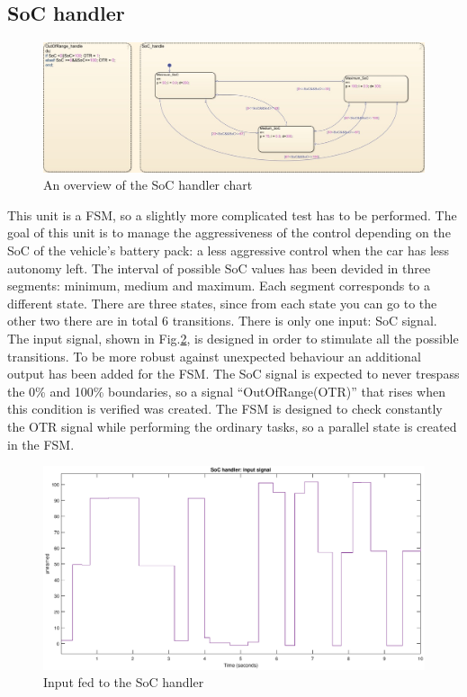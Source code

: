 \documentclass[12pt,a4paper]{report}
\begin{document}
\subsection{SoC handler}
\begin{figure}[!h]
	\centering
	\includegraphics[scale=0.34]{SoC_handle_subs.jpg}
	\caption{An overview of the SoC handler chart}
	\label{SoC_handle_subs}
\end{figure}
\FloatBarrier
This unit is a FSM, so a slightly more complicated test has to be performed. The goal of this unit is to manage the aggressiveness of the control depending on the SoC of the vehicle’s battery pack: a less aggressive control when the car has less autonomy left. The interval of possible SoC values has been devided in three segments: minimum, medium and maximum. Each segment corresponds to a different state. There are three states, since from each state you can go to the other two there are in total 6 transitions.  There is only one input: SoC signal. The input signal, shown in Fig.\ref{SoC_handle_input}, is designed in order to stimulate all the possible transitions. 
To be more robust against unexpected behaviour an additional output has been added for the FSM. The SoC signal is expected to never trespass the 0\% and 100\% boundaries, so a signal “OutOfRange(OTR)” that rises when this condition is verified was created. The FSM is designed to check constantly the OTR signal while performing the ordinary tasks, so a parallel state is created in the FSM.
\begin{figure}[!h]
	\centering
	\includegraphics[scale=0.34]{SoC_handle_input.eps}
	\caption{Input fed to the SoC handler }
	\label{SoC_handle_input}
\end{figure}
\end{document}
